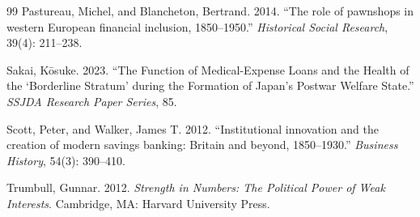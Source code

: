 \documentclass[12pt]{article}
\begin{document}
\begin{thebibliography}{99}
Pastureau, Michel, and Blancheton, Bertrand. 2014.
\newblock ``The role of pawnshops in western European financial inclusion,
  1850--1950.''
\newblock \textit{Historical Social Research}, 39(4): 211--238.

Sakai, K\={o}suke. 2023.
\newblock ``The Function of Medical-Expense Loans and the Health of the
  `Borderline Stratum' during the Formation of Japan's Postwar Welfare
  State.''
\newblock \textit{SSJDA Research Paper Series}, 85.

Scott, Peter, and Walker, James T. 2012.
\newblock ``Institutional innovation and the creation of modern savings banking:
  Britain and beyond, 1850--1930.''
\newblock \textit{Business History}, 54(3): 390--410.

Trumbull, Gunnar. 2012.
\newblock \textit{Strength in Numbers: The Political Power of Weak Interests}.
\newblock Cambridge, MA: Harvard University Press.

\end{thebibliography}
\end{document}
